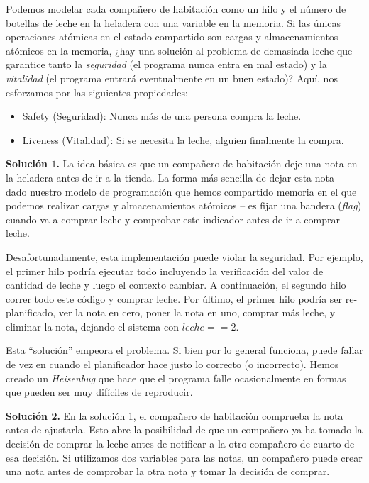 \documentclass[10pt]{book}
\begin{document}
Podemos modelar cada compañero de habitación como un hilo y el número de botellas de leche en la heladera con una variable en la memoria. Si las únicas operaciones atómicas en el estado compartido son cargas y almacenamientos atómicos en la memoria, ¿hay una solución al problema de demasiada leche que garantice tanto la \textit{seguridad} (el programa nunca entra en mal estado) y la \textit{vitalidad} (el programa entrará eventualmente en un buen estado)? Aquí, nos esforzamos por las siguientes propiedades:
\begin{itemize}
\item Safety (Seguridad): Nunca más de una persona compra la leche.
\item Liveness (Vitalidad): Si se necesita la leche, alguien finalmente la compra.
\end{itemize}

\textbf{Solución $1$.} La idea básica es que un compañero de habitación deje una nota en la heladera antes de ir a la tienda. La forma más sencilla de dejar esta nota -- dado nuestro modelo de programación que hemos compartido memoria en el que podemos realizar cargas y almacenamientos atómicos -- es fijar una bandera (\textit{flag}) cuando va a comprar leche y comprobar este indicador antes de ir a comprar leche.

Desafortunadamente, esta implementación puede violar la seguridad. Por ejemplo, el primer hilo podría ejecutar todo incluyendo la verificación del valor de cantidad de leche y luego el contexto cambiar. A continuación, el segundo hilo correr todo este código y comprar leche. Por último, el primer hilo podría ser re-planificado, ver la nota en cero, poner la nota en uno, comprar más leche, y eliminar la nota, dejando el sistema con $leche == 2$.

Esta ``solución'' empeora el problema. Si bien por lo general funciona, puede fallar de vez en cuando el planificador hace justo lo correcto (o incorrecto). Hemos creado un \textit{Heisenbug} que hace que el programa falle ocasionalmente en formas que pueden ser muy difíciles de reproducir.

\textbf{Solución 2.} En la solución 1, el compañero de habitación comprueba la nota antes de ajustarla. Esto abre la posibilidad de que un compañero ya ha tomado la decisión de comprar la leche antes de notificar a la otro compañero de cuarto de esa decisión. Si utilizamos dos variables para las notas, un compañero puede crear una nota antes de comprobar la otra nota y tomar la decisión de comprar.
\end{document}
